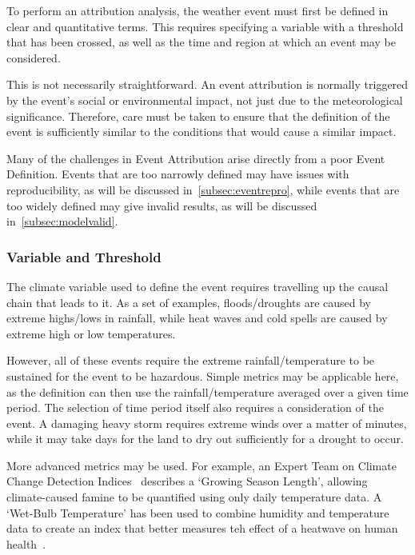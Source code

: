To perform an attribution analysis,
    the weather event must first be defined in clear and quantitative terms.
This requires specifying a variable with a threshold that has been crossed,
    as well as the time and region at which an event may be considered.

This is not necessarily straightforward.
An event attribution is normally triggered by the event's social or environmental impact,
     not just due to the meteorological significance.
Therefore, care must be taken to ensure that the definition of the event is sufficiently similar to the conditions that would cause a similar impact.

Many of the challenges in Event Attribution arise directly from a poor Event Definition.
Events that are too narrowly defined may have issues with reproducibility,
    as will be discussed in~\ref{subsec:eventrepro},
    while events that are too widely defined may give invalid results,
    as will be discussed in~\ref{subsec:modelvalid}.

\subsubsection{Variable and Threshold}

The climate variable used to define the event requires travelling up the causal chain that leads to it.
As a set of examples,
    floods/droughts are caused by extreme highs/lows in rainfall,
    while heat waves and cold spells are caused by extreme high or low temperatures.

However,
    all of these events require the extreme rainfall/temperature to be sustained for the event to be hazardous.
Simple metrics may be applicable here,
    as the definition can then use the rainfall/temperature averaged over a given time period.
The selection of time period itself also requires a consideration of the event.
A damaging heavy storm requires extreme winds over a matter of minutes,
    while it may take days for the land to dry out sufficiently for a drought to occur.

More advanced metrics may be used.
For example, an Expert Team on Climate Change Detection Indices~\cite{Zhang_2011}
    describes a `Growing Season Length',
    allowing climate-caused famine to be quantified using only daily temperature data.
A `Wet-Bulb Temperature' has been used to combine humidity and temperature data to create an index that better measures teh effect of a heatwave on human health~\cite{Li_2020}.


